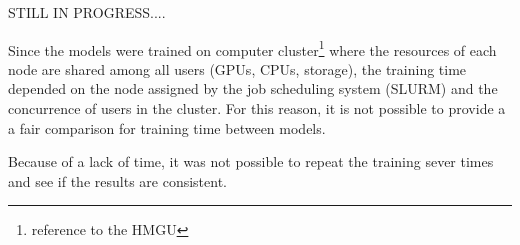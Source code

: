 
\glsresetall
\graphicspath{{./Sections/Results/Resources/}}

STILL IN PROGRESS....

Since the models were trained on computer cluster\footnote{reference to the HMGU} where the resources of each node are shared among all users (GPUs, CPUs, storage), the training time depended on the node assigned by the job scheduling system (SLURM) and the concurrence of users in the cluster. For this reason, it is not possible to provide a a fair comparison for training time between models.

Because of a lack of time, it was not possible to repeat the training sever times and see if the results are consistent.
